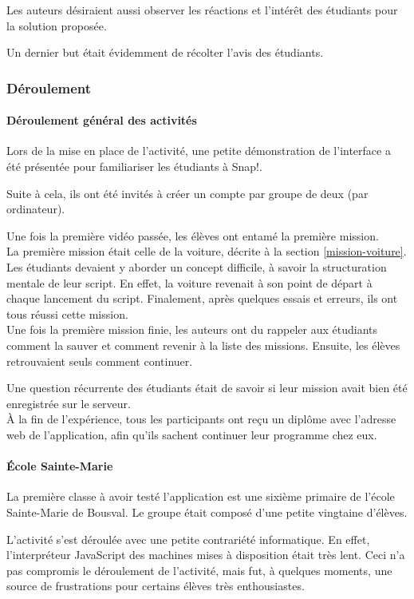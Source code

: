 Les auteurs désiraient aussi observer les réactions et l'intérêt des étudiants pour la solution proposée.

Un dernier but était évidemment de récolter l'avis des étudiants. 

\subsubsection{Déroulement}
\paragraph{Déroulement général des activités}
Lors de la mise en place de l'activité, une petite démonstration de l'interface a été présentée pour familiariser les étudiants à Snap!. 

Suite à cela, ils ont été invités à créer un compte par groupe de deux (par ordinateur).

Une fois la première vidéo passée, les élèves ont entamé la première mission.\\

La première mission était celle de la voiture, décrite à la section \ref{mission-voiture}. Les étudiants devaient y aborder un concept difficile, à savoir la structuration mentale de leur script. En effet, la voiture revenait à son point de départ à chaque lancement du script. Finalement, après quelques essais et erreurs, ils ont tous réussi cette mission.\\

Une fois la première mission finie, les auteurs ont du rappeler aux étudiants comment la sauver et comment revenir à la liste des missions. Ensuite, les élèves retrouvaient seuls comment continuer. 

Une question récurrente des étudiants était de savoir si leur mission avait bien été enregistrée sur le serveur.\\

À la fin de l'expérience, tous les participants ont reçu un diplôme avec l'adresse web de l'application, afin qu'ils sachent continuer leur programme chez eux.

\paragraph{École Sainte-Marie} 
La première classe à avoir testé l'application est une sixième primaire de l'école Sainte-Marie de Bousval. Le groupe était composé d'une petite vingtaine d'élèves.

L'activité s'est déroulée avec une petite contrariété informatique. En effet, l'interpréteur JavaScript des machines mises à disposition était très lent. Ceci n'a pas compromis le déroulement de l'activité, mais fut, à quelques moments, une source de frustrations pour certains élèves très enthousiastes.

